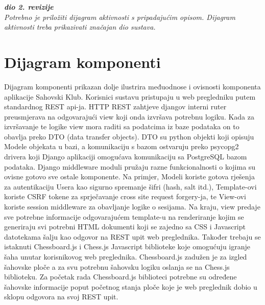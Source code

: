 			\textbf{\textit{dio 2. revizije}}\\
			
			 \textit{Potrebno je priložiti dijagram aktivnosti s pripadajućim opisom. Dijagram aktivnosti treba prikazivati značajan dio sustava.}
			
			\eject
		\section{Dijagram komponenti}
		
			Dijagram komponenti prikazan dolje ilustrira međuodnose i ovisnosti komponenta aplikacije Sahovski Klub. Korisnici sustavu pristupaju u web pregledniku putem standardnog REST api-ja. HTTP REST zahtjeve djangov interni ruter preusmjerava na odgovarajući view koji onda izvršava potrebnu logiku. Kada za izvršavanje te logike view mora raditi sa podatcima iz baze podataka on to obavlja preko DTO (data transfer objects). DTO su python objekti koji opisuju Modele objekata u bazi, a komunikaciju s bazom ostvaruju preko psycopg2 drivera koji Django aplikaciji omogućava komunikaciju sa PostgreSQL bazom podataka. Django middleware moduli pružaju razne funkcionalnosti o kojima su ovisne gotovo sve ostale komponente. Na primjer, Modeli koriste gotova rješenja za autentikaciju Usera kao sigurno spremanje šifri (hash, salt itd.), Template-ovi koriste CSRF tokene za sprječavanje cross site request forgery-ja, te View-ovi koriste session middleware za obavljanje logike o sesijama. Na kraju, view predaje sve potrebne informacije odgovarajućem template-u na renderiranje kojim se generiraju svi potrebni HTML dokumenti koji se zajedno sa CSS i Javascript datotekama šalju kao odgovor na REST upit web preglednika. Također trebaju se istaknuti Chessboard.js i Chess.js Javascript biblioteke koje omogućuju igranje šaha unutar korisnikovog web preglednika. Chessboard.js zadužen je za izgled šahovske ploče a za svu potrebnu šahovsku logiku oslanja se na Chess.js biblioteku. Za početak rada Chessboard.js biblioteci potrebne su određene šahovske informacije poput početnog stanja ploče koje je web preglednik dobio u sklopu odgovora na svoj REST upit.
			 
